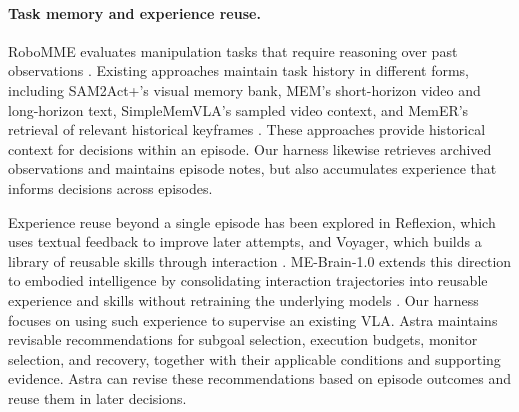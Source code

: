 \paragraph{Task memory and experience reuse.}
RoboMME evaluates manipulation tasks that require reasoning over past observations . Existing approaches maintain task history in different forms, including SAM2Act+'s visual memory bank, MEM's short-horizon video and long-horizon text, SimpleMemVLA's sampled video context, and MemER's retrieval of relevant historical keyframes . These approaches provide historical context for decisions within an episode. Our harness likewise retrieves archived observations and maintains episode notes, but also accumulates experience that informs decisions across episodes.

Experience reuse beyond a single episode has been explored in Reflexion, which uses textual feedback to improve later attempts, and Voyager, which builds a library of reusable skills through interaction . ME-Brain-1.0 extends this direction to embodied intelligence by consolidating interaction trajectories into reusable experience and skills without retraining the underlying models . Our harness focuses on using such experience to supervise an existing VLA. Astra maintains revisable recommendations for subgoal selection, execution budgets, monitor selection, and recovery, together with their applicable conditions and supporting evidence. Astra can revise these recommendations based on episode outcomes and reuse them in later decisions.




